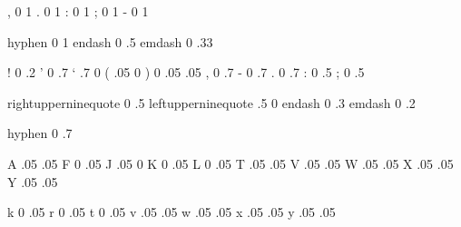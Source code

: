 

\startfonthandling [pure]

   , 0 1
   . 0 1
   : 0 1
   ; 0 1
   - 0 1

   hyphen 0 1
   endash 0 .5 
   emdash 0 .33 %

\stopfonthandling

\startfonthandling [punctuation]

   !  0  .2
   '  0  .7
   ` .7   0
   ( .05  0   
   )  0  .05
    .05
   ,  0  .7
   -  0  .7
   .  0  .7
   :  0  .5
   ;  0  .5

   rightupperninequote  0 .5
   leftupperninequote  .5  0 
   endash               0 .3  
   emdash               0 .2  

   hyphen               0 .7

\stopfonthandling

\startfonthandling [alpha]

   A .05 .05
   F  0  .05
   J .05   0
   K  0  .05  
   L  0  .05
   T .05 .05
   V .05 .05
   W .05 .05
   X .05 .05
   Y .05 .05
  
   k  0  .05 
   r  0  .05
   t  0  .05 
   v .05 .05
   w .05 .05
   x .05 .05
   y .05 .05

